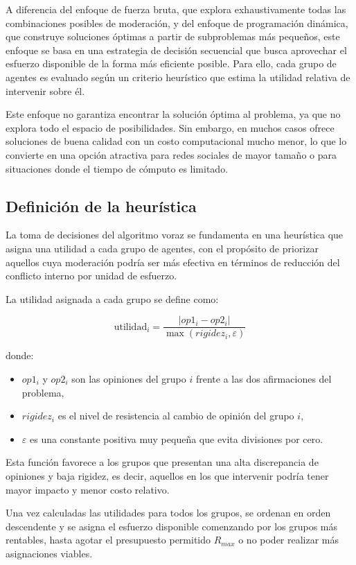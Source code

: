 \documentclass[11pt,letter]{article}
\begin{document}
    A diferencia del enfoque de fuerza bruta, que explora exhaustivamente todas las combinaciones posibles de moderación, y del enfoque de programación dinámica, que construye soluciones óptimas a partir de subproblemas más pequeños, este enfoque se basa en una estrategia de decisión secuencial que busca aprovechar el esfuerzo disponible de la forma más eficiente posible. Para ello, cada grupo de agentes es evaluado según un criterio heurístico que estima la utilidad relativa de intervenir sobre él.

    Este enfoque no garantiza encontrar la solución óptima al problema, ya que no explora todo el espacio de posibilidades. Sin embargo, en muchos casos ofrece soluciones de buena calidad con un costo computacional mucho menor, lo que lo convierte en una opción atractiva para redes sociales de mayor tamaño o para situaciones donde el tiempo de cómputo es limitado.

    \subsection{Definición de la heurística}
    \label{sec:heuristica}
    La toma de decisiones del algoritmo voraz se fundamenta en una heurística que asigna una utilidad a cada grupo de agentes, con el propósito de priorizar aquellos cuya moderación podría ser más efectiva en términos de reducción del conflicto interno por unidad de esfuerzo.

    La utilidad asignada a cada grupo se define como:

    \[
        \text{utilidad}_i = \frac{|op1_i - op2_i|}{\max(rigidez_i, \varepsilon)}
    \]

    donde:
    \begin{itemize}
        \item $op1_i$ y $op2_i$ son las opiniones del grupo $i$ frente a las dos afirmaciones del problema,
        \item $rigidez_i$ es el nivel de resistencia al cambio de opinión del grupo $i$,
        \item $\varepsilon$ es una constante positiva muy pequeña que evita divisiones por cero.
    \end{itemize}

    Esta función favorece a los grupos que presentan una alta discrepancia de opiniones y baja rigidez, es decir, aquellos en los que intervenir podría tener mayor impacto y menor costo relativo.

    Una vez calculadas las utilidades para todos los grupos, se ordenan en orden descendente y se asigna el esfuerzo disponible comenzando por los grupos más rentables, hasta agotar el presupuesto permitido $R_{max}$ o no poder realizar más asignaciones viables.
\end{document}

